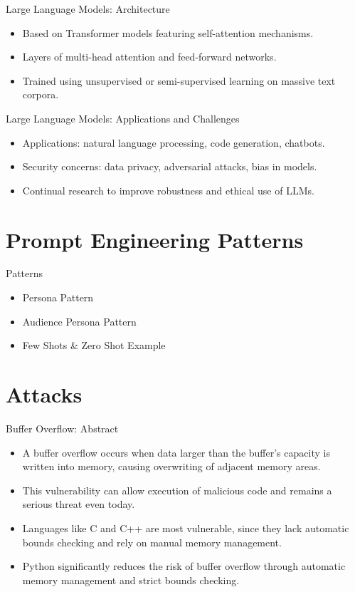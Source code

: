 \documentclass[t,ignorenonframetext]{beamer}
\begin{document}
\begin{frame}{Large Language Models: Architecture}
\begin{itemize}
\item Based on Transformer models featuring self-attention mechanisms.
\item Layers of multi-head attention and feed-forward networks.
\item Trained using unsupervised or semi-supervised learning on massive text corpora.
\end{itemize}
\end{frame}

\begin{frame}{Large Language Models: Applications and Challenges}
\begin{itemize}
\item Applications: natural language processing, code generation, chatbots.
\item Security concerns: data privacy, adversarial attacks, bias in models.
\item Continual research to improve robustness and ethical use of LLMs.
\end{itemize}
\end{frame}
\section{Prompt Engineering Patterns}
\begin{frame}{Patterns}
\begin{itemize}
\item Persona Pattern
\item Audience Persona Pattern
\item Few Shots \& Zero Shot Example
\end{itemize}
\end{frame} 

\section{Attacks}
\begin{frame}{Buffer Overflow: Abstract}
\begin{itemize}
    \item A buffer overflow occurs when data larger than the buffer’s capacity is written into memory, causing overwriting of adjacent memory areas.
    \item This vulnerability can allow execution of malicious code and remains a serious threat even today.
    \item Languages like C and C++ are most vulnerable, since they lack automatic bounds checking and rely on manual memory management.
    \item Python significantly reduces the risk of buffer overflow through automatic memory management and strict bounds checking.
\end{itemize}
\end{frame}
\end{document}

